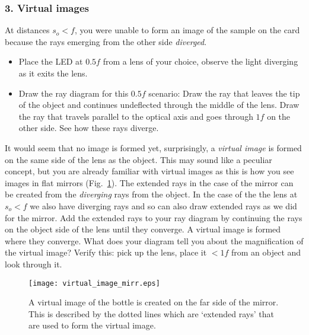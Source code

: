 \documentclass[a4paper]{report}
\begin{document}

\clearpage


\subsubsection{3. Virtual images}
At distances $s_o<f$, you were unable to form an image of the sample on the card because the rays emerging from the other side \textit{diverged}.
\begin{itemize}
\item Place the LED at $0.5f$ from a lens of your choice, observe the light diverging as it exits the lens.
\item Draw the ray diagram for this $0.5f$ scenario:
Draw the ray that leaves the tip of the object and continues undeflected through the middle of the lens. 
Draw the ray that travels parallel to the optical axis and goes through $1f$ on the other side.
See how these rays diverge. 
\end{itemize}

It would seem that no image is formed yet, surprisingly, a \textit{virtual image} is formed on the same side of the lens as the object. 
This may sound like a peculiar concept, but you are already familiar with virtual images as this is how you see images in flat mirrors (Fig.~\ref{fig:mirror}). 
The extended rays in the case of the mirror can be created from the \textit{diverging} rays from the object. 
In the case of the the lens at $s_o<f$ we also have diverging rays and so can also draw extended rays as we did for the mirror. 
Add the extended rays to your ray diagram by continuing the rays on the object side of the lens until they converge. 
A virtual image is formed where they converge.
What does your diagram tell you about the magnification of the virtual image?
Verify this: pick up the lens, place it $<1f$ from an object and look through it.
\begin{figure}[h]
\center
\texttt{[image: virtual\_image\_mirr.eps]}
\caption{A virtual image of the bottle is created on the far side of the mirror. 
This is described by the dotted lines which are `extended rays' that are used to form the virtual image. }
\label{fig:mirror}
\end{figure}
\end{document}
